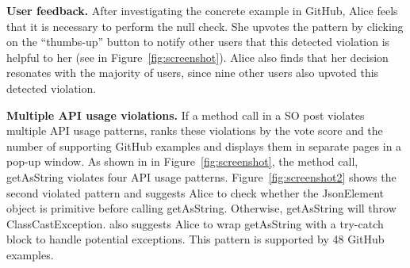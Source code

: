 {\bf User feedback.} After investigating the concrete example in GitHub, Alice feels that it is necessary to perform the {\ttt null} check. She upvotes the pattern by clicking on the ``thumbs-up'' button to notify other users that this detected violation is helpful to her (see  in Figure~\ref{fig:screenshot}). Alice also finds that her decision resonates with the majority of {\tool} users, since nine other users also upvoted this detected violation.

{\bf Multiple API usage violations.} If a method call in a SO post violates multiple API usage patterns, {\tool} ranks these violations by the vote score and the number of supporting GitHub examples and displays them in separate pages in a pop-up window. As shown in  in Figure~\ref{fig:screenshot}, the method call, {\ttt getAsString} violates four API usage patterns. Figure~\ref{fig:screenshot2} shows the second violated pattern and suggests Alice to check whether the {\ttt JsonElement} object is primitive before calling {\ttt getAsString}. Otherwise, {\ttt getAsString} will throw {\ttt ClassCastException}. {\tool} also suggests Alice to wrap {\ttt getAsString} with a {\ttt try-catch} block to handle potential exceptions. This pattern is supported by 48 GitHub examples.


